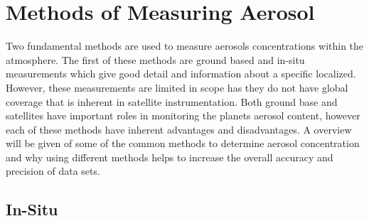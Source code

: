 \section{Methods of Measuring Aerosol}

Two fundamental methods are used to measure aerosols concentrations within the atmosphere. The first of these methods are ground based and in-situ measurements which give good detail and information about a specific localized. However, these measurements are limited in scope has they do not have global coverage that is inherent in satellite instrumentation. Both ground base and satellites have important roles in monitoring the planets aerosol content, however each of these methods have inherent advantages and disadvantages. A overview will be given of some of the common methods to determine aerosol concentration and why using different methods helps to increase the overall accuracy and precision of data sets.

\subsection{In-Situ}

